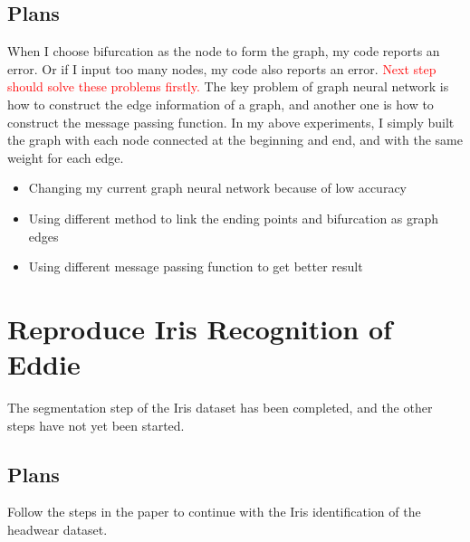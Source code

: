 \subsection{Plans}
When I choose bifurcation as the node to form the graph, my code reports an error. Or if I input too many nodes, my code also reports an error. \textcolor{red}{Next step should solve these problems firstly.} The key problem of graph neural network is how to construct the edge information of a graph, and another one is how to construct the message passing function. In my above experiments, I simply built the graph with each node connected at the beginning and end, and with the same weight for each edge. 
\begin{itemize}
    \item Changing my current graph neural network because of low accuracy
    \item Using different method to link the ending points and bifurcation as graph edges
    \item Using different message passing function to get better result
\end{itemize}




\section{Reproduce Iris Recognition of Eddie}

The segmentation step of the Iris dataset has been completed, and the other steps have not yet been started.

\subsection{Plans}
Follow the steps in the paper to continue with the Iris identification of the headwear dataset.



